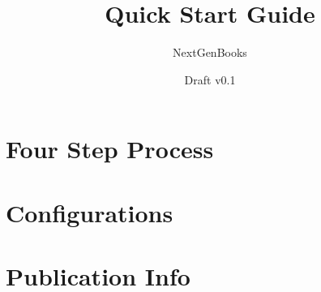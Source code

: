 \documentclass[11pt]{book}
\title{Quick Start Guide}
\author{NextGenBooks}
\date{Draft v0.1}
\begin{document}
\maketitle
\def\title#1{\chapter{#1}}
\tableofcontents

        
        
\part{Four Step Process}
        
        
        
        
        
        
        
        
\part{Configurations}
        
        
\part{Publication Info}
        
        


\printbibliography[title={Bibliography}]
\end{document}
